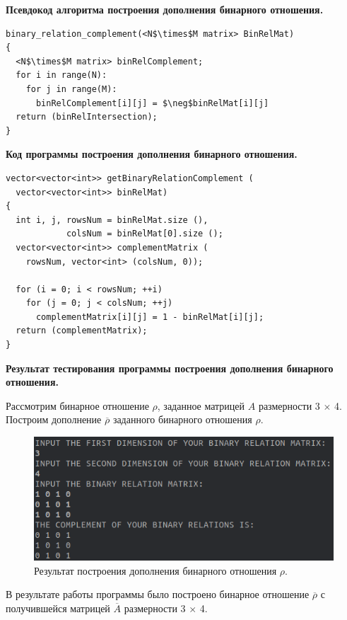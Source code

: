 \documentclass[spec, och, otchet, hidelinks]{SCWorks}
\newcommand{\tbf}[1]{\textbf{#1}}
\begin{document}
\par \tbf{Псевдокод алгоритма построения дополнения бинарного отношения.}

\begin{lstlisting}[caption=Псевдокод алгоритма., mathescape]
binary_relation_complement(<N$\times$M matrix> BinRelMat)
{
  <N$\times$M matrix> binRelComplement;
  for i in range(N):
    for j in range(M):
      binRelComplement[i][j] = $\neg$binRelMat[i][j]
  return (binRelIntersection);
}
\end{lstlisting}

\par \tbf{Код программы построения дополнения бинарного отношения.}
\begin{lstlisting}[caption=Код программы., mathescape]
vector<vector<int>> getBinaryRelationComplement (
  vector<vector<int>> binRelMat)
{
  int i, j, rowsNum = binRelMat.size (), 
            colsNum = binRelMat[0].size ();
  vector<vector<int>> complementMatrix (
    rowsNum, vector<int> (colsNum, 0));

  for (i = 0; i < rowsNum; ++i)
    for (j = 0; j < colsNum; ++j)
      complementMatrix[i][j] = 1 - binRelMat[i][j];
  return (complementMatrix);
}
\end{lstlisting}

\newpage

\par \tbf{Результат тестирования программы построения дополнения бинарного
  отношения.}
\par Рассмотрим бинарное отношение $\rho$, заданное матрицей $A$ размерности 3
$\times$ 4. Построим дополнение $\overline \rho$ заданного бинарного отношения
$\rho$.

\begin{figure}[h]
  \center\includegraphics[scale=0.7]{binary_relation_complement.png}
  \caption{Результат построения дополнения бинарного отношения $\rho$.}
\end{figure}

\par В результате работы программы было построено бинарное отношение $\overline
\rho$ с получившейся матрицей $\overline A$ размерности 3 $\times$ 4. \\
\end{document}
